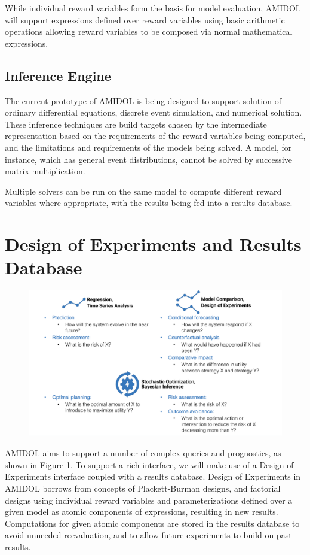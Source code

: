 \documentclass[11pt]{article}
\newcommand{\amidol}{\textsc{AMIDOL}}
\begin{document}
While individual reward variables form the basis for model evaluation, \amidol{} will support expressions defined over reward variables using basic arithmetic operations allowing reward variables to be composed via normal mathematical expressions.

\subsection{Inference Engine}

The current prototype of \amidol{} is being designed to support solution of ordinary differential equations, discrete event simulation, and numerical solution.  These inference techniques are build targets chosen by the intermediate representation based on the requirements of the reward variables being computed, and the limitations and requirements of the models being solved.  A model, for instance, which has general event distributions, cannot be solved by successive matrix multiplication.

Multiple solvers can be run on the same model to compute different reward variables where appropriate, with the results being fed into a results database.

\section{Design of Experiments and Results Database}

\begin{figure}
  \includegraphics[width=\textwidth]{figs/table.pdf}
  \caption{}
  \label{Fig:InferenceClasses}
\end{figure}

\amidol{} aims to support a number of complex queries and prognostics, as shown in Figure \ref{Fig:InferenceClasses}.  To support a rich interface, we will make use of a Design of Experiments \cite{montgomery2017design} interface coupled with a results database.  Design of Experiments in \amidol{} borrows from concepts of Plackett-Burman designs, and factorial designs using individual reward variables and parameterizations defined over a given model as atomic components of expressions, resulting in new results.  Computations for given atomic components are stored in the results database to avoid unneeded reevaluation, and to allow future experiments to build on past results.
\end{document}
